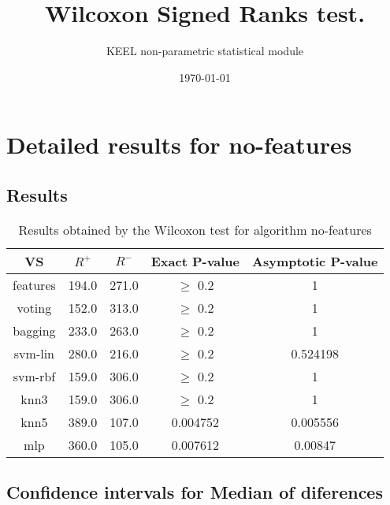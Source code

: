 \documentclass[a4paper,10pt]{article}
\title{Wilcoxon Signed Ranks test.}
\date{\today}
\author{KEEL non-parametric statistical module}
\begin{document}
\pagestyle{empty}
\maketitle
\thispagestyle{empty}



\section{Detailed results for no-features}


\subsection{Results}

\begin{table}[!htp]
\centering\small
\begin{tabular}{
|c|c|c|c|c|}
\hline
 VS & $R^{+}$ & $R^{-}$ & Exact P-value & Asymptotic P-value \\ \hline 
features & 194.0 & 271.0 & $\geq$ 0.2 & 1\\ \hline 
voting & 152.0 & 313.0 & $\geq$ 0.2 & 1\\ \hline 
bagging & 233.0 & 263.0 & $\geq$ 0.2 & 1\\ \hline 
svm-lin & 280.0 & 216.0 & $\geq$ 0.2 & 0.524198\\ \hline 
svm-rbf & 159.0 & 306.0 & $\geq$ 0.2 & 1\\ \hline 
knn3 & 159.0 & 306.0 & $\geq$ 0.2 & 1\\ \hline 
knn5 & 389.0 & 107.0 & 0.004752 & 0.005556\\ \hline 
mlp & 360.0 & 105.0 & 0.007612 & 0.00847\\ \hline 

\end{tabular}
\caption{Results obtained by the Wilcoxon test for algorithm no-features}
\end{table}

\subsection{Confidence intervals for Median of diferences}
\end{document}
